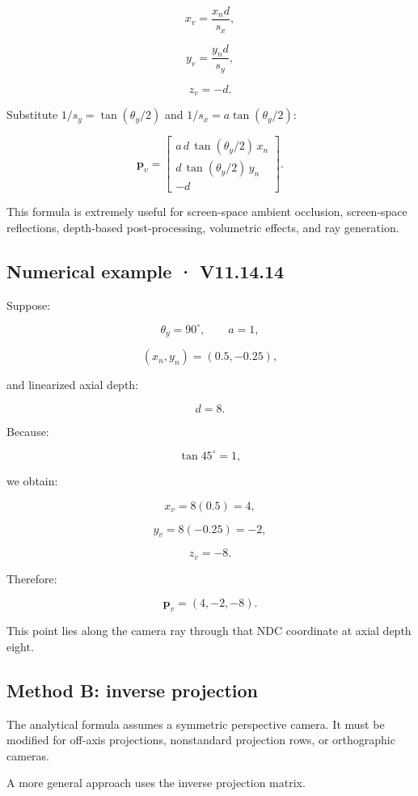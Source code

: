 \[ x_v=\frac{x_nd}{s_x}, \]

\[ y_v=\frac{y_nd}{s_y}, \]

\[ z_v=-d. \]

Substitute \(1/s_y=\tan(\theta_y/2)\) and \(1/s_x=a\tan(\theta_y/2)\):

\[ \boxed{ \mathbf p_v= \begin{bmatrix} a\,d\,\tan(\theta_y/2)\,x_n\\ d\,\tan(\theta_y/2)\,y_n\\ -d \end{bmatrix}. } \]

This formula is extremely useful for screen-space ambient occlusion, screen-space reflections, depth-based post-processing, volumetric effects, and ray generation.

\subsection{Numerical example · V11.14.14}\label{02-foundations-ii-ch035-numerical-example-v11.14.14}

Suppose:

\[ \theta_y=90^\circ,\qquad a=1, \]

\[ (x_n,y_n)=(0.5,-0.25), \]

and linearized axial depth:

\[ d=8. \]

Because:

\[ \tan45^\circ=1, \]

we obtain:

\[ x_v=8(0.5)=4, \]

\[ y_v=8(-0.25)=-2, \]

\[ z_v=-8. \]

Therefore:

\[ \boxed{\mathbf p_v=(4,-2,-8)}. \]

This point lies along the camera ray through that NDC coordinate at axial depth eight.

\subsection{Method B: inverse projection}\label{02-foundations-ii-ch035-method-b-inverse-projection}

The analytical formula assumes a symmetric perspective camera. It must be modified for off-axis projections, nonstandard projection rows, or orthographic cameras.

A more general approach uses the inverse projection matrix.

